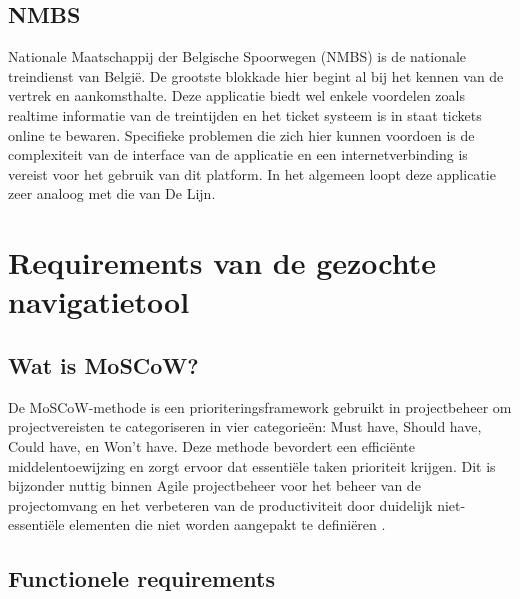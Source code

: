 \subsection{NMBS}
\label{sec:nmbs}

Nationale Maatschappij der Belgische Spoorwegen (NMBS) is de nationale treindienst van België. De grootste blokkade hier begint al bij het kennen van de vertrek en aankomsthalte. Deze applicatie biedt wel enkele voordelen zoals realtime informatie van de treintijden en het ticket systeem is in staat tickets online te bewaren. Specifieke problemen die zich hier kunnen voordoen is de complexiteit van de interface van de applicatie en een internetverbinding is vereist voor het gebruik van dit platform. In het algemeen loopt deze applicatie zeer analoog met die van De Lijn.

\section{Requirements van de gezochte navigatietool}
\label{sec:requirements van de gezochte navigatietool}


\subsection{Wat is MoSCoW?}
De MoSCoW-methode is een prioriteringsframework gebruikt in projectbeheer om projectvereisten te categoriseren in vier categorieën: Must have, Should have, Could have, en Won't have. Deze methode bevordert een efficiënte middelentoewijzing en zorgt ervoor dat essentiële taken prioriteit krijgen. Dit is bijzonder nuttig binnen Agile projectbeheer voor het beheer van de projectomvang en het verbeteren van de productiviteit door duidelijk niet-essentiële elementen die niet worden aangepakt te definiëren \autocite{Brush2023}.

\subsection{Functionele requirements}
\label{sec:functionele requirements}


